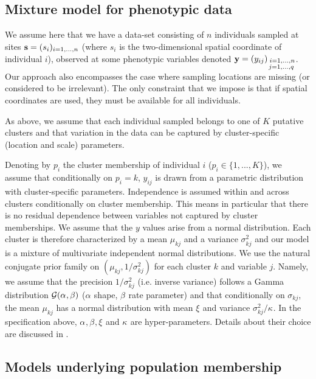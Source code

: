 \documentclass{article}
\begin{document}
\subsection{Mixture model for phenotypic data}\label{sec:pheno}
We assume here  that we have a data-set consisting of  $n$ individuals sampled at sites ${\bf s}=(s_i)_{i=1,...,n}$ 
(where $s_i$ is the two-dimensional spatial coordinate of individual $i$),  
observed at some phenotypic variables denoted  ${\bf y}=(y_{ij})_{\substack{\;i=1,...,n \\j=1,...,q}}$.
 Our approach also encompasses the case where sampling locations are missing (or considered to be 
irrelevant). The only constraint that we impose is that if spatial coordinates are used, 
they must be available for all individuals.

As above, we assume that each  individual sampled belongs to one of $K$ putative clusters 
and that variation in the data 
can be captured by cluster-specific (location and scale) parameters. 


Denoting by $p_i$ the cluster membership of individual $i$ ($p_i \in \{1,...,K\}$), 
we assume that conditionally on $p_i=k$, $y_{ij}$ is drawn from a parametric distribution with cluster-specific parameters. 
Independence is assumed within and across clusters  conditionally on cluster membership. This means in particular that 
there is no residual dependence between variables not captured by cluster memberships. 
We assume  that the $y$ values arise from  a  normal distribution. 
Each cluster is  therefore characterized by a mean $\mu_{kj}$ and a variance $\sigma^2_{kj}$
and our model is a mixture of multivariate independent normal distributions. 
We use the natural conjugate prior family on 
 $(\mu_{kj},1/\sigma^2_{kj})$ for each cluster $k$ and variable $j$.
Namely, we  assume that the precision $1/\sigma^2_{kj}$ (i.e.  inverse variance)  follows  a Gamma distribution ${\cal G}(\alpha_{},\beta_{})$
($\alpha_{}$ shape, $\beta_{}$ rate parameter) and that conditionally on $\sigma_{kj}$, the mean $\mu_{kj} $ has a normal distribution  with 
mean $\xi_{}$ and variance $\sigma^2_{kj} / \kappa_{}$. 
In the specification above, $\alpha_{},\beta_{}, \xi_{}$ and $\kappa_{}$ are hyper-parameters. Details about their choice 
are  discussed in \citet{Guillot12a}. 


\clearpage
\subsection{Models underlying population membership}\label{sec:mbrship}
\end{document}
